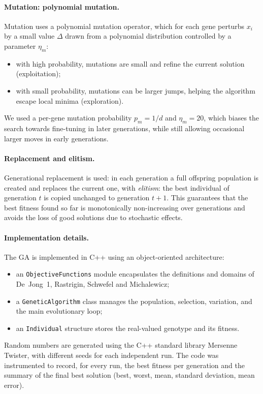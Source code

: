 \documentclass[11pt]{article}
\begin{document}
\paragraph{Mutation: polynomial mutation.}
Mutation uses a polynomial mutation operator, which for each gene perturbs
$x_i$ by a small value $\Delta$ drawn from a polynomial distribution
controlled by a parameter $\eta_m$:
\begin{itemize}
  \item with high probability, mutations are small and refine the current
        solution (exploitation);
  \item with small probability, mutations can be larger jumps, helping the
        algorithm escape local minima (exploration).
\end{itemize}
We used a per-gene mutation probability $p_m = 1/d$ and $\eta_m = 20$,
which biases the search towards fine-tuning in later generations, while
still allowing occasional larger moves in early generations.

\paragraph{Replacement and elitism.}
Generational replacement is used: in each generation a full offspring
population is created and replaces the current one, with \emph{elitism}:
the best individual of generation $t$ is copied unchanged to generation
$t+1$.
This guarantees that the best fitness found so far is monotonically
non-increasing over generations and avoids the loss of good solutions due to
stochastic effects.

\paragraph{Implementation details.}
The GA is implemented in C++ using an object-oriented architecture:
\begin{itemize}
  \item an \texttt{ObjectiveFunctions} module encapsulates the definitions
        and domains of De~Jong~1, Rastrigin, Schwefel and Michalewicz;
  \item a \texttt{GeneticAlgorithm} class manages the population, selection,
        variation, and the main evolutionary loop;
  \item an \texttt{Individual} structure stores the real-valued genotype and
        its fitness.
\end{itemize}
Random numbers are generated using the C++ standard library Mersenne Twister,
with different seeds for each independent run.
The code was instrumented to record, for every run, the best fitness per
generation and the summary of the final best solution (best, worst, mean,
standard deviation, mean error).
\end{document}
